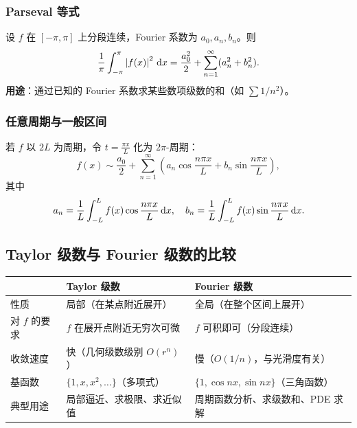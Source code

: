 \documentclass{ctexart}
\begin{document}
\subsubsection*{Parseval 等式}

\begin{theorem}[Parseval 等式]
  设 $f$ 在 $[-\pi,\pi]$ 上分段连续，Fourier 系数为 $a_0, a_n, b_n$。则
  \[
    \frac{1}{\pi} \int_{-\pi}^{\pi} \left| f(x) \right|^2 \,\mathrm{d} x
    = \frac{a_0^2}{2} + \sum_{n=1}^\infty (a_n^2 + b_n^2).
  \]
  \textbf{用途}：通过已知的 Fourier 系数求某些数项级数的和（如 $\sum 1/n^2$）。
\end{theorem}

\subsubsection*{任意周期与一般区间}

若 $f$ 以 $2L$ 为周期，令 $t = \frac{\pi x}{L}$ 化为 $2\pi$-周期：
\[
  f(x) \sim \frac{a_0}{2} + \sum_{n=1}^\infty
  \left( a_n \cos\frac{n\pi x}{L} + b_n \sin\frac{n\pi x}{L} \right),
\]
其中
\[
  a_n = \frac{1}{L} \int_{-L}^{L} f(x)\cos\frac{n\pi x}{L} \,\mathrm{d} x, \quad
  b_n = \frac{1}{L} \int_{-L}^{L} f(x)\sin\frac{n\pi x}{L} \,\mathrm{d} x.
\]

\subsection{Taylor 级数与 Fourier 级数的比较}

\begin{center}
\renewcommand{\arraystretch}{1.5}
\begin{tabular}{>{\raggedright\arraybackslash}p{2.5cm}
                >{\raggedright\arraybackslash}p{5cm}
                >{\raggedright\arraybackslash}p{5cm}}
  \toprule
  & \textbf{Taylor 级数} & \textbf{Fourier 级数} \\
  \midrule
  性质
    & 局部（在某点附近展开）
    & 全局（在整个区间上展开） \\
  对 $f$ 的要求
    & $f$ 在展开点附近无穷次可微
    & $f$ 可积即可（分段连续） \\
  收敛速度
    & 快（几何级数级别 $O(r^n)$）
    & 慢（$O(1/n)$，与光滑度有关） \\
  基函数
    & $\{1, x, x^2, \ldots\}$（多项式）
    & $\{1, \cos nx, \sin nx\}$（三角函数） \\
  典型用途
    & 局部逼近、求极限、求近似值
    & 周期函数分析、求级数和、PDE 求解 \\
  \bottomrule
\end{tabular}
\end{center}
\end{document}
